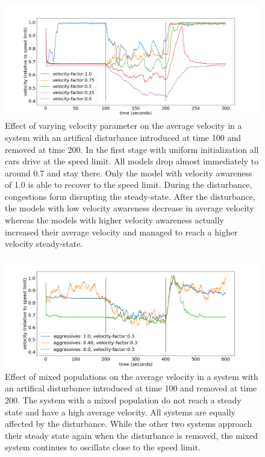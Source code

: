 \documentclass[11pt,a4paper,twocolumn]{article}
\begin{document}
 
\begin{figure}[t]
    \centering
      \includegraphics[scale=0.35, trim={0 0 0 0 }]{figs/velocity_over_time.png}
      \caption{Effect of varying velocity parameter on the average velocity in a system with an artifical disturbance introduced at time 100 and removed at time 200. In the first stage with uniform initialization all cars drive at the speed limit. All models drop almost immediately to around 0.7 and stay there. Only the model with velocity awareness of 1.0 is able to recover to the speed limit. During the disturbance, congestions form disrupting the steady-state. After the disturbance, the models with low velocity awareness decrease in average velocity whereas the models with higher velocity awareness actually increased their average velocity and managed to reach a higher velocity steady-state.}
      \label{fig:vel_over_time}
\end{figure}
 
\begin{figure}[t]     
      \centering
       \includegraphics[scale=0.35]{figs/velocity_over_time_aggressive.png}
       \caption{Effect of mixed populations on the average velocity in a system with an artifical disturbance introduced at time 100 and removed at time 200. The system with a mixed population do not reach a steady state and have a high average velocity. All systems are equally affected by the disturbance. While the other two systems approach their steady state again when the disturbance is removed, the mixed system continues to oscillate close to the speed limit. }
       \label{fig:vel_agg_over_time}
 \end{figure}
\end{document}
